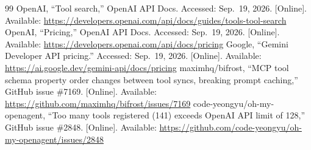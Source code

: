 \documentclass[11pt]{article}
\begin{document}
\begin{thebibliography}{99}
 OpenAI, ``Tool search,'' OpenAI API Docs. Accessed: Sep.\ 19, 2026. [Online]. Available: \url{https://developers.openai.com/api/docs/guides/tools-tool-search}
 OpenAI, ``Pricing,'' OpenAI API Docs. Accessed: Sep.\ 19, 2026. [Online]. Available: \url{https://developers.openai.com/api/docs/pricing}
 Google, ``Gemini Developer API pricing.'' Accessed: Sep.\ 19, 2026. [Online]. Available: \url{https://ai.google.dev/gemini-api/docs/pricing}
 maximhq/bifrost, ``MCP tool schema property order changes between tool syncs, breaking prompt caching,'' GitHub issue \#7169. [Online]. Available: \url{https://github.com/maximhq/bifrost/issues/7169}
 code-yeongyu/oh-my-openagent, ``Too many tools registered (141) exceeds OpenAI API limit of 128,'' GitHub issue \#2848. [Online]. Available: \url{https://github.com/code-yeongyu/oh-my-openagent/issues/2848}
\end{thebibliography}
\end{document}
